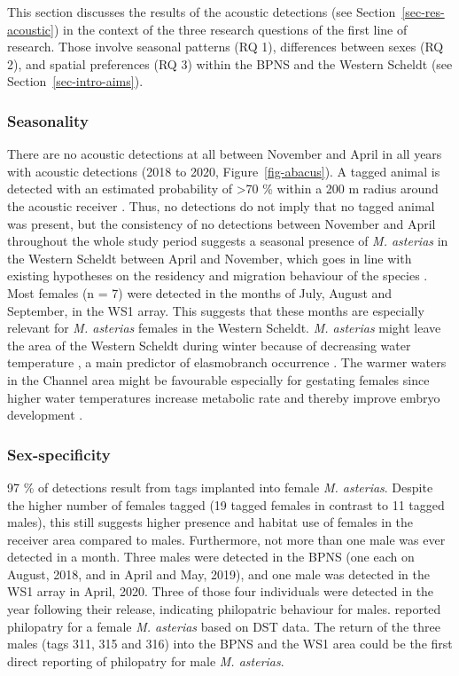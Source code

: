 \documentclass[
  authoryear,
  review,
  3p]{elsarticle}
\begin{document}
This section discusses the results of the acoustic detections (see
Section~\ref{sec-res-acoustic}) in the context of the three research
questions of the first line of research. Those involve seasonal patterns
(RQ 1), differences between sexes (RQ 2), and spatial preferences (RQ 3)
within the BPNS and the Western Scheldt (see
Section~\ref{sec-intro-aims}).

\hypertarget{sec-disc-acoustic-seasonality}{%
\subsubsection{Seasonality}\label{sec-disc-acoustic-seasonality}}

There are no acoustic detections at all between November and April in
all years with acoustic detections (2018 to 2020,
Figure~\ref{fig-abacus}). A tagged animal is detected with an estimated
probability of \textgreater70 \% within a 200 m radius around the
acoustic receiver \citep{reubens_2018}. Thus, no detections do not imply
that no tagged animal was present, but the consistency of no detections
between November and April throughout the whole study period suggests a
seasonal presence of \emph{M. asterias} in the Western Scheldt between
April and November, which goes in line with existing hypotheses on the
residency and migration behaviour of the species
\citep{breve_2016, breve_2020, griffiths_2020}. Most females (n = 7)
were detected in the months of July, August and September, in the WS1
array. This suggests that these months are especially relevant for
\emph{M. asterias} females in the Western Scheldt. \emph{M. asterias}
might leave the area of the Western Scheldt during winter because of
decreasing water temperature \citep{breve_2016}, a main predictor of
elasmobranch occurrence \citep{martin_2010}. The warmer waters in the
Channel area might be favourable especially for gestating females since
higher water temperatures increase metabolic rate and thereby improve
embryo development \citep{hurst_1999}.

\hypertarget{sex-specificity}{%
\subsubsection{Sex-specificity}\label{sex-specificity}}

97 \% of detections result from tags implanted into female \emph{M.
asterias}. Despite the higher number of females tagged (19 tagged
females in contrast to 11 tagged males), this still suggests higher
presence and habitat use of females in the receiver area compared to
males. Furthermore, not more than one male was ever detected in a month.
Three males were detected in the BPNS (one each on August, 2018, and in
April and May, 2019), and one male was detected in the WS1 array in
April, 2020. Three of those four individuals were detected in the year
following their release, indicating philopatric behaviour for males.
\citet{griffiths_2020} reported philopatry for a female \emph{M.
asterias} based on DST data. The return of the three males (tags 311,
315 and 316) into the BPNS and the WS1 area could be the first direct
reporting of philopatry for male \emph{M. asterias}.
\end{document}
